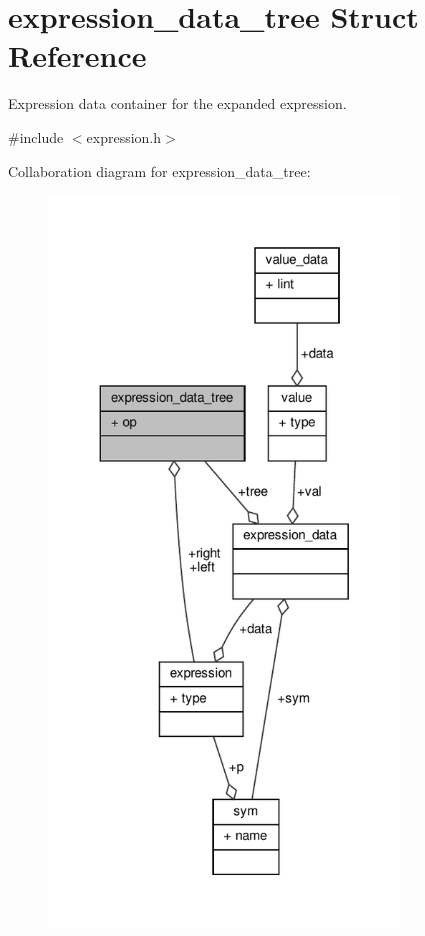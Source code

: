 \hypertarget{structexpression__data__tree}{}\section{expression\+\_\+data\+\_\+tree Struct Reference}
\label{structexpression__data__tree}


Expression data container for the expanded expression.  




{\ttfamily \#include $<$expression.\+h$>$}



Collaboration diagram for expression\+\_\+data\+\_\+tree\+:
\nopagebreak
\begin{figure}[H]
\begin{center}
\leavevmode
\includegraphics[height=550pt]{structexpression__data__tree__coll__graph}
\end{center}
\end{figure}
